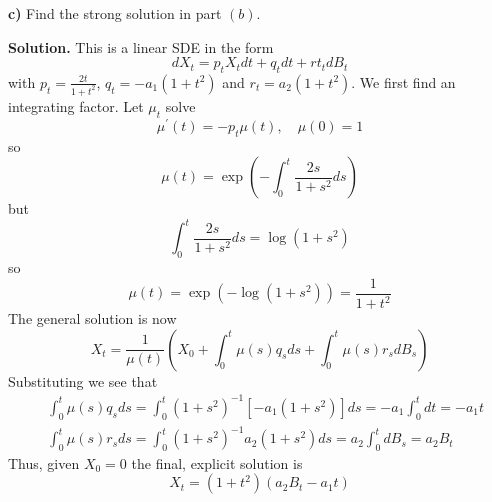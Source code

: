 \documentclass{article}
\begin{document}
\begin{tcolorbox}
[colframe=black,colback=gray!5,boxrule=0.5pt]
 \textbf{c)} Find the strong solution in part $(b)$.
\end{tcolorbox}
\textbf{Solution.} This is a linear SDE in the form 
$$dX_t = p_t X_t dt + q_tdt + rt_tdB_t$$
with $p_t = \frac{2t}{1+t^2}$, $q_t = -a_1(1+t^2)$ and $r_t = a_2(1+t^2)$. We first find an integrating factor. Let $\mu_t$ solve 
$$\mu^\prime(t) = -p_t \mu(t), \quad \mu(0)=1$$
so 
$$\mu(t) = \exp\left(-\int_0^t\frac{2s}{1+s^2}ds\right)$$
but
$$\int_0^t\frac{2s}{1+s^2}ds = \log(1+s^2)$$
so 
$$\mu(t) = \exp(-\log(1+s^2)) = \frac{1}{1+t^2}$$
The general solution is now
$$X_t = \frac{1}{\mu(t)}\left(X_0 + \int_0^t\mu(s)q_sds + \int_0^t\mu(s)r_sdB_s\right)$$
Substituting we see that 
\begin{align*}
    & \int_0^t \mu(s)q_sds = \int_0^t(1+s^2)^{-1}[-a_1(1+s^2)]ds = -a_1\int_0^tdt = -a_1t \\
    & \int_0^t\mu(s)r_sds = \int_0^t(1+s^2)^{-1}a_2(1+s^2)ds = a_2\int_0^tdB_s = a_2B_t
\end{align*}
Thus, given $X_0=0$ the final, explicit solution is 
$$X_t = (1+t^2)(a_2B_t - a_1t)$$
\newpage
 
\end{document}
